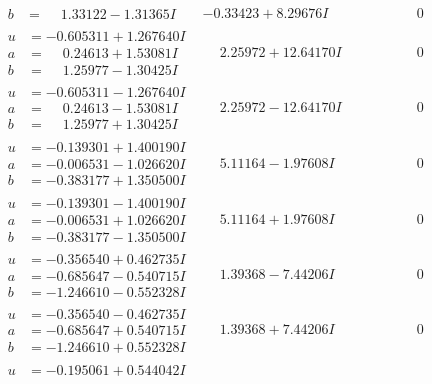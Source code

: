 \documentclass[1p]{elsarticle_modified}
\theoremstyle{definition}
\begin{document}
$$\begin{array}{c|c|c}
\begin{aligned}
b &= \phantom{-}1.33122 - 1.31365 I\end{aligned}
 & -0.33423 + 8.29676 I & \phantom{-0.000000 } 0 \\ \hline\begin{aligned}
u &= -0.605311 + 1.267640 I \\
a &= \phantom{-}0.24613 + 1.53081 I \\
b &= \phantom{-}1.25977 - 1.30425 I\end{aligned}
 & \phantom{-}2.25972 + 12.64170 I & \phantom{-0.000000 } 0 \\ \hline\begin{aligned}
u &= -0.605311 - 1.267640 I \\
a &= \phantom{-}0.24613 - 1.53081 I \\
b &= \phantom{-}1.25977 + 1.30425 I\end{aligned}
 & \phantom{-}2.25972 - 12.64170 I & \phantom{-0.000000 } 0 \\ \hline\begin{aligned}
u &= -0.139301 + 1.400190 I \\
a &= -0.006531 - 1.026620 I \\
b &= -0.383177 + 1.350500 I\end{aligned}
 & \phantom{-}5.11164 - 1.97608 I & \phantom{-0.000000 } 0 \\ \hline\begin{aligned}
u &= -0.139301 - 1.400190 I \\
a &= -0.006531 + 1.026620 I \\
b &= -0.383177 - 1.350500 I\end{aligned}
 & \phantom{-}5.11164 + 1.97608 I & \phantom{-0.000000 } 0 \\ \hline\begin{aligned}
u &= -0.356540 + 0.462735 I \\
a &= -0.685647 - 0.540715 I \\
b &= -1.246610 - 0.552328 I\end{aligned}
 & \phantom{-}1.39368 - 7.44206 I & \phantom{-0.000000 } 0 \\ \hline\begin{aligned}
u &= -0.356540 - 0.462735 I \\
a &= -0.685647 + 0.540715 I \\
b &= -1.246610 + 0.552328 I\end{aligned}
 & \phantom{-}1.39368 + 7.44206 I & \phantom{-0.000000 } 0 \\ \hline\begin{aligned}
u &= -0.195061 + 0.544042 I \\

\end{aligned}
\end{array}$$
\end{document}
